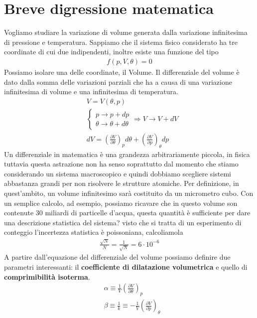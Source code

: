 \documentclass[10pt,a4paper]{article}
\begin{document}
\section{Breve digressione matematica}
Vogliamo studiare la variazione di volume generata dalla variazione infinitesima di pressione e temperatura. Sappiamo che il sistema fisico considerato ha tre coordinate di cui due indipendenti, inoltre esiste una funzione del tipo
\begin{align*}
	f(p, V, \theta) = 0
\end{align*}
Possiamo isolare una delle coordinate, il Volume. Il differenziale del volume è dato dalla somma delle variazioni parziali che ha a causa di una variazione infinitesima di volume e una infinitesima di temperatura. 
\begin{align*}
	&V = V(\theta, p)\\
	&\begin{cases}
		p\rightarrow p + dp\\
		\theta \rightarrow \theta + d\theta
	\end{cases} \Rightarrow V \rightarrow V + dV\\
	&dV = (\frac{\partial V}{\partial \theta})_p d\theta + (\frac{\partial V}{\partial p})_{\theta} dp
\end{align*}
Un differenziale in matematica è una grandezza arbitrariamente piccola, in fisica tuttavia questa astrazione non ha senso soprattutto dal momento che stiamo considerando un sistema macroscopico e quindi dobbiamo scegliere sistemi abbastanza grandi per non risolvere le  strutture atomiche. Per definizione, in quest'ambito, un volume infinitesimo sarà costituito da un micrometro cubo. Con un semplice calcolo, ad esempio, possiamo ricavare che in questo volume son contenute 30 miliardi di particelle d'acqua, questa quantità è sufficiente per dare una descrizione statistica del sistema? visto che si tratta di un esperimento di conteggio l'incertezza statistica è poissoniana, calcoliamola
\begin{align*}
	\frac{\sqrt{N}}{N} = \frac{1}{\sqrt{N}} = 6 \cdot 10^{-6}
\end{align*}
A partire dall'equazione del differenziale del volume possiamo definire due parametri interessanti: il \textbf{coefficiente di dilatazione volumetrica} e quello di \textbf{comprimibilità isoterma}.
\begin{align*}
	&\alpha \equiv \frac{1}{V}( \frac{\partial V}{\partial \theta})_p\\
	&\beta \equiv \frac{1}{k} \equiv - \frac{1}{V}( \frac{\partial V}{\partial p})_{\theta}
\end{align*}
\end{document}
